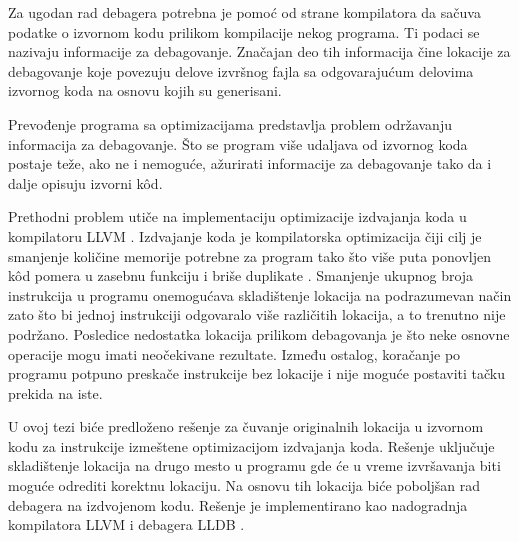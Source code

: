 \documentclass[12pt,oneside]{memoir}
\begin{document}
Za ugodan rad debagera potrebna je pomoć od strane kompilatora da sačuva podatke o izvornom kodu prilikom kompilacije nekog programa.
Ti podaci se nazivaju informacije za debagovanje.
Značajan deo tih informacija čine lokacije za debagovanje koje povezuju delove izvršnog fajla sa odgovarajućum delovima izvornog koda na osnovu kojih su generisani.

Prevođenje programa sa optimizacijama predstavlja problem održavanju informacija za debagovanje.
Što se program više udaljava od izvornog koda postaje teže, ako ne i nemoguće, ažurirati informacije za debagovanje tako da i dalje opisuju izvorni k\^od.


Prethodni problem utiče na implementaciju optimizacije izdvajanja koda u kompilatoru LLVM \cite{llvm}.
Izdvajanje koda je kompilatorska optimizacija čiji cilj je smanjenje količine memorije potrebne za program tako što više puta ponovljen k\^od pomera u zasebnu funkciju i briše duplikate \cite{grune2012design}.
Smanjenje ukupnog broja instrukcija u programu onemogućava skladištenje lokacija na podrazumevan način zato što bi jednoj instrukciji odgovaralo više različitih lokacija, a to trenutno nije podržano.
Posledice nedostatka lokacija prilikom debagovanja je što neke osnovne operacije mogu imati neočekivane rezultate.
Između ostalog, koračanje po programu potpuno preskače instrukcije bez lokacije i nije moguće postaviti tačku prekida na iste.

U ovoj tezi biće predloženo rešenje za čuvanje originalnih lokacija u izvornom kodu za instrukcije izmeštene optimizacijom izdvajanja koda.
Rešenje uključuje skladištenje lokacija na drugo mesto u programu gde će u vreme izvršavanja biti moguće odrediti korektnu lokaciju.
Na osnovu tih lokacija biće poboljšan rad debagera na izdvojenom kodu.
Rešenje je implementirano kao nadogradnja kompilatora LLVM i debagera LLDB \cite{lldb}.
\end{document}
